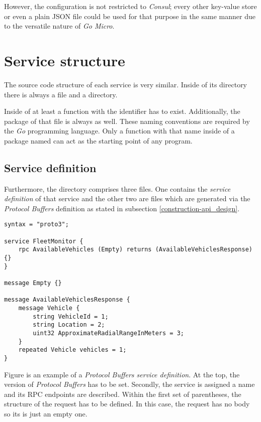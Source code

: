 \documentclass[12pt,a4paper,twoside]{report}
\begin{document}
However, the configuration is not restricted to \textit{Consul};
every other key-value store or even a plain JSON file could be used
for that purpose in the same manner due to the versatile nature of \textit{Go Micro}.


\section{Service structure}

The source code structure of each service is very similar.
Inside of its directory there is always a  file and a 
directory.

Inside of  at least a function with the identifier
 has to exist. Additionally, the package of that file is always
 as well. These naming conventions are required by the
\textit{Go} programming language. Only a function with that name inside of
a package named  can act as the starting point of any program.

\subsection{Service definition} \label{subsect:service-definition}
Furthermore, the  directory comprises three files.
One contains the \textit{service definition} of that service and the other
two are  files which are generated via the \textit{Protocol Buffers}
definition as stated in subsection \ref{construction-api_design}.

\begin{lstlisting}[title=services/fleet-monitor/proto/fleet-monitor.proto, language=protobuf3, float, floatplacement=H]
syntax = "proto3";

service FleetMonitor {
    rpc AvailableVehicles (Empty) returns (AvailableVehiclesResponse) {}
}

message Empty {}

message AvailableVehiclesResponse {
    message Vehicle {
        string VehicleId = 1;
        string Location = 2;
        uint32 ApproximateRadialRangeInMeters = 3;
    }
    repeated Vehicle vehicles = 1;
}
\end{lstlisting}

Figure  is an example of
a \textit{Protocol Buffers service definition}.
At the top, the version of \textit{Protocol Buffers} has to be set.
Secondly, the service is assigned a name and its RPC endpoints are described.
Within the first set of parentheses, the structure of the request has to be
defined. In this case, the request has no body so its  is just an
empty one.
\end{document}

